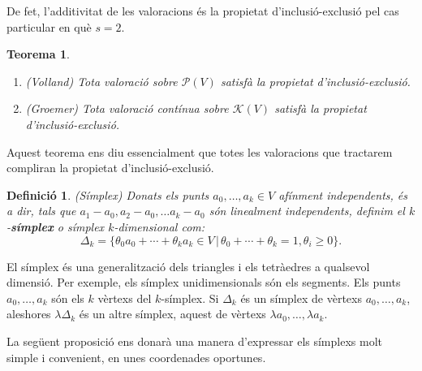 \documentclass{article}
\newtheorem{teorema}{Teorema}
\newtheorem{definicio}{Definici\'{o}}
\theoremstyle{definition}
\begin{document}
De fet, l'additivitat de les valoracions \'{e}s la propietat d'inclusi\'{o}-exclusi\'{o} pel cas particular en qu\`{e} $s=2$.

\begin{teorema}\label{Teo:inex}
\begin{enumerate}
    \item (Volland) Tota valoraci\'{o} sobre $\mathcal{P}(V)$ satisf\`{a} la propietat d'inclusi\'{o}-exclusi\'{o}.
    \item (Groemer) Tota valoraci\'{o} cont\'{i}nua sobre $\mathcal{K}(V)$ satisf\`{a} la propietat d'inclusi\'{o}-exclusi\'{o}.
\end{enumerate}
\end{teorema}

Aquest teorema ens diu essencialment que totes les valoracions que tractarem compliran la propietat d'inclusi\'{o}-exclusi\'{o}.

\begin{definicio}
(S\'{i}mplex) Donats els punts $a_0,\ldots,a_k\in V$ af\'{i}nment independents, \'{e}s a dir, tals que $a_1-a_0,a_2-a_0,\ldots a_k-a_0$ s\'{o}n linealment independents, definim el $k$-\textbf{s\'{i}mplex} o s\'{i}mplex $k$-dimensional com:
\[\Delta_k=\{\theta_0a_0+\cdots+\theta_ka_k\in V\,|\,\theta_0+\cdots+\theta_k=1,\theta_i\geq0\}.\]
\end{definicio}

El s\'{i}mplex \'{e}s una generalitzaci\'{o} dels triangles i els tetr\`{a}edres a qualsevol dimensi\'{o}. Per exemple, els s\'{i}mplex unidimensionals s\'{o}n els segments. Els punts $a_0,\ldots,a_k$ s\'{o}n els $k$ v\`{e}rtexs del $k$-s\'{i}mplex. Si $\Delta_k$ \'{e}s un s\'{i}mplex de v\`{e}rtexs $a_0,\ldots,a_k$, aleshores $\lambda\Delta_k$ \'{e}s un altre s\'{i}mplex, aquest de v\`{e}rtexs $\lambda a_0,\ldots,\lambda a_k$.

La seg\"{u}ent proposici\'{o} ens donar\`{a} una manera d'expressar els s\'{i}mplexs molt simple i convenient, en unes coordenades oportunes.
\end{document}
